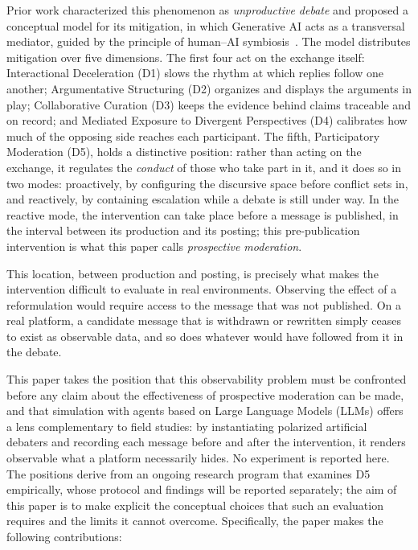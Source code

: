 \documentclass[conference]{IEEEtran}
\begin{document}
Prior work characterized this phenomenon as \textit{unproductive debate} and
proposed a conceptual model for its mitigation, in which Generative AI acts as
a transversal mediator, guided by the principle of human--AI
symbiosis~\cite{moura2026hostility}. The model distributes mitigation over
five dimensions. The first four act on the exchange itself: Interactional
Deceleration (D1) slows the rhythm at which replies follow one another;
Argumentative Structuring (D2) organizes and displays the arguments in play;
Collaborative Curation (D3) keeps the evidence behind claims traceable and on
record; and Mediated Exposure to Divergent Perspectives (D4) calibrates how
much of the opposing side reaches each participant. The fifth, Participatory
Moderation (D5), holds a distinctive position: rather than acting on the
exchange, it regulates the \textit{conduct} of those who take part in it, and
it does so in two modes: proactively, by configuring the discursive space
before conflict sets in, and reactively, by containing escalation while a
debate is still under way. In the reactive mode, the intervention can take
place before a message is published, in the interval between its production
and its posting; this pre-publication intervention is what this paper calls
\textit{prospective moderation}.

This location, between production and posting, is precisely what makes the
intervention difficult to evaluate in real environments. Observing the effect of a reformulation would require
access to the message that was not published. On a real platform, a candidate
message that is withdrawn or rewritten simply ceases to exist as observable
data, and so does whatever would have followed from it in the debate.

This paper takes the position that this observability problem must be
confronted before any claim about the effectiveness of prospective moderation
can be made, and that simulation with agents based on Large Language Models
(LLMs) offers a lens complementary to field studies: by instantiating
polarized artificial debaters and recording each message before and after the
intervention, it renders observable what a platform necessarily hides. No
experiment is reported here. The positions derive from an ongoing research
program that examines D5 empirically, whose protocol and findings will be
reported separately; the aim of this paper is to make explicit the conceptual
choices that such an evaluation requires and the limits it cannot overcome.
Specifically, the paper makes the following contributions:
\end{document}
